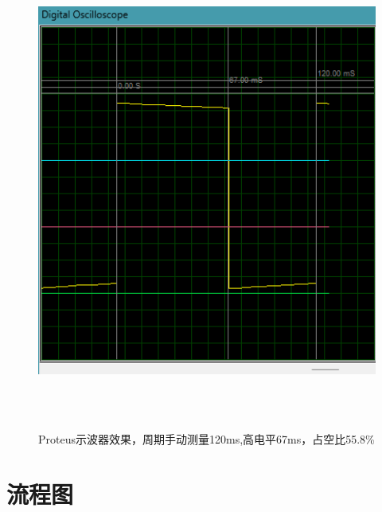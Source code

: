 \documentclass[12pt,hyperref,a4paper,UTF8]{ctexart}
\begin{document}
\begin{figure}[H] %
    \centering
    \includegraphics[width=1\textwidth]{figures/201.png} %
    \caption{Proteus示波器效果，周期手动测量120ms,高电平67ms，占空比55.8\% } %
    \label{fig:example} %
\end{figure}






\section{流程图}
\end{document}
